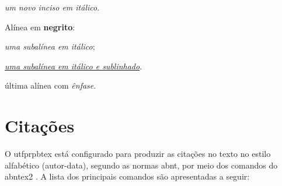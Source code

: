 \begin{alineas}
    \begin{incisos}%
        \item \textit{um novo inciso em itálico}.
    \end{incisos}
    \item Alínea em \textbf{negrito}:
    \begin{subalineas}%
        \item \textit{uma subalínea em itálico};
        \item \underline{\textit{uma subalínea em itálico e sublinhado}}.
    \end{subalineas}
    \item última alínea com \emph{ênfase}.
\end{alineas}

\section{Citações}\label{sec:citacoes}

O \gls{utfprpbtex} está configurado para produzir as citações no texto no estilo alfabético (autor-data), segundo as normas \gls{abnt}, por meio dos comandos do \gls{abntex2} \cite{abnTeX2:2013Cite,abnTeX2:2013CiteAlf}. A lista dos principais comandos são apresentadas a seguir:

